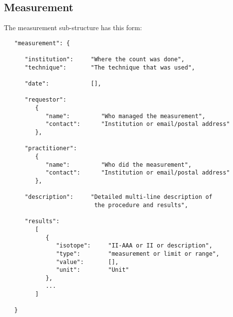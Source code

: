 \documentclass[11pt, letterpaper]{article}
\begin{document}
\newpage

\subsection{Measurement} %

The measurement sub-structure has this form:

\begin{small}
\begin{verbatim}
   "measurement": {
    
      "institution":     "Where the count was done",
      "technique":       "The technique that was used",     
      
      "date":            [],
      
      "requestor":
         {
            "name":         "Who managed the measurement", 
            "contact":      "Institution or email/postal address"
         },                  
         
      "practitioner":
         {
            "name":         "Who did the measurement", 
            "contact":      "Institution or email/postal address"
         },
         
      "description":     "Detailed multi-line description of
                          the procedure and results",
                            
      "results":
         [
            {
               "isotope":     "II-AAA or II or description",
               "type":        "measurement or limit or range",
               "value":       [],
               "unit":        "Unit"
            },
            ...
         ]
               
   }
\end{verbatim}
\end{small}
\end{document}
